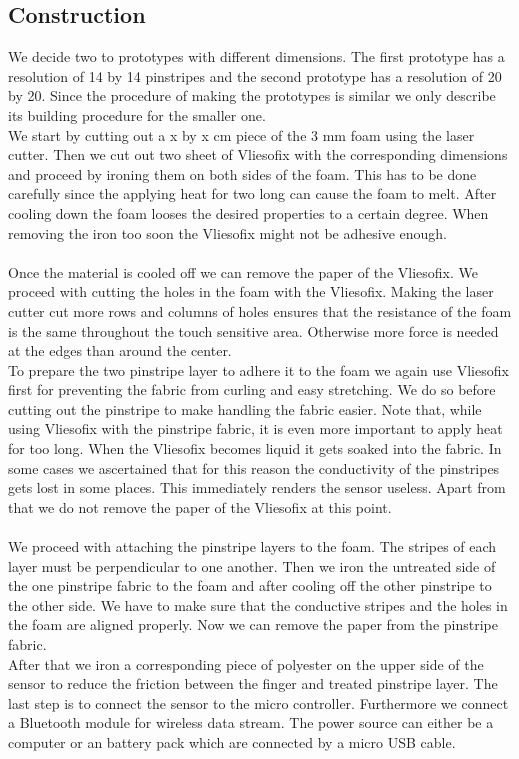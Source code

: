 \subsection{Construction}
We decide two to prototypes with different dimensions. The first prototype has a resolution of 14 by 14 pinstripes and the second prototype has a resolution of 20 by 20. Since the procedure of making the prototypes is similar we only describe its building procedure for the smaller one. 
\\
We start by cutting out a  x by x cm piece of the 3 mm foam using the laser cutter. Then we cut out two sheet of Vliesofix with the corresponding dimensions and proceed by ironing them on both sides of the foam. This has to be done carefully since the applying heat for two long can cause the foam to melt. After cooling down the foam looses the desired properties to a certain degree. When removing the iron too soon the Vliesofix might not be adhesive enough. 
\\ \\
Once the material is cooled off we can remove the paper of the Vliesofix. We proceed with cutting the holes in the foam with the Vliesofix. Making the laser cutter cut more  rows and columns of holes ensures that the resistance of the foam is the same throughout the touch sensitive area. Otherwise more force is needed at the edges than around the center. 
\\
To prepare the two pinstripe layer to adhere it to the foam we again use Vliesofix first for preventing the fabric from curling and easy stretching. We do so before cutting out the pinstripe to make handling the fabric easier. Note that, while using Vliesofix with the pinstripe fabric, it is even more important to apply heat for too long. When the Vliesofix becomes liquid it gets soaked into the fabric. In some cases we ascertained that for this reason the conductivity of the pinstripes gets lost in some places. This immediately renders the sensor useless. Apart from that we do not remove the paper of the Vliesofix at this point.
\\ \\
We proceed with attaching the pinstripe layers to the foam. The stripes of each layer must be perpendicular to one another. Then we iron the untreated side of the  one pinstripe fabric to the foam and after cooling off the other pinstripe to the other side.  We have to make sure that the conductive stripes and the holes in the foam are aligned properly. Now we can remove the paper from the pinstripe fabric.
\\
After that we iron a corresponding piece of polyester on the upper side of the sensor to reduce the friction between the finger and treated pinstripe layer. The last step is to connect the sensor to the micro controller. Furthermore we connect a   Bluetooth module for wireless data stream. The power source can either be a computer or an battery pack which are connected by a micro USB cable.
 

